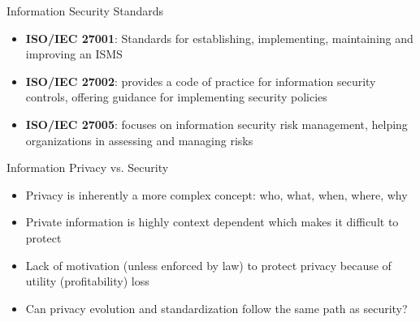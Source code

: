 \documentclass[12pt,aspectratio=169,handout]{beamer}
\begin{document}

\begin{frame}{Information Security Standards}

\begin{itemize} \setlength\itemsep{4mm}
%
\item \textbf{ISO/IEC 27001}: Standards for establishing, implementing, maintaining and improving an ISMS
%
\item \textbf{ISO/IEC 27002}: provides a code of practice for information security controls, offering guidance for implementing security policies
%
\item \textbf{ISO/IEC 27005}: focuses on information security risk management, helping organizations in assessing and managing risks
%
\end{itemize}

\end{frame}


\begin{frame}{Information Privacy vs. Security}

\begin{itemize} \setlength\itemsep{3mm}
%
\item Privacy is inherently a more complex concept: who, what, when, where, why
%
\item Private information is highly context dependent which makes it difficult to protect
%
\item Lack of motivation (unless enforced by law) to protect privacy because of utility (profitability) loss
%
\item Can privacy evolution and standardization follow the same path as security?
%
\end{itemize}

\end{frame}

\end{document}

